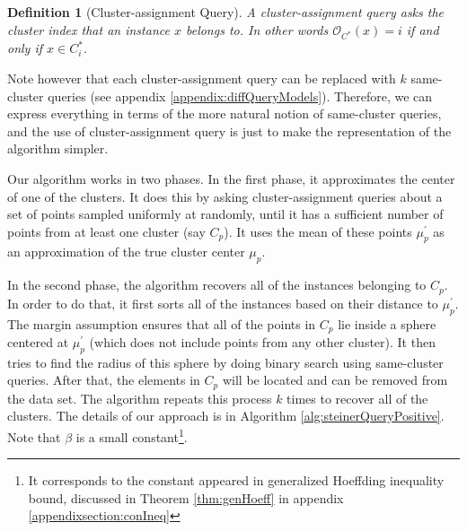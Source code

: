 \documentclass[12pt]{article}
\newcommand{\mc}{\mathcal}
\newtheorem{definition}[theorem]{Definition}
\begin{document}
\begin{definition}[Cluster-assignment Query]
A cluster-assignment query asks the cluster index that an instance $x$ belongs to. In other words ${\mc O_{C^*}}(x) = i$ if and only if $x \in C^*_i$.
\end{definition}

Note however that each cluster-assignment query can be replaced with $k$ same-cluster queries (see appendix \ref{appendix:diffQueryModels}). Therefore, we can express everything in terms of the more natural notion of same-cluster queries, and the use of cluster-assignment query is just to make the representation of the algorithm simpler.

Our algorithm works in two phases. In the first phase, it approximates the center of one of the clusters. It does this by asking cluster-assignment queries about a set of points sampled uniformly at randomly, until it has a sufficient number of points from at least one cluster (say $C_p$). It uses the mean of these points $\mu_p^\prime$ as an approximation of the true cluster center $\mu_p$. 

In the second phase, the algorithm recovers all of the instances belonging to $C_p$. In order to do that, it first sorts all of the instances based on their distance to $\mu_p^\prime$. The margin assumption ensures that all of the points in $C_p$ lie inside a sphere centered at $\mu_p^\prime$ (which does not include points from any other cluster). It then tries to find the radius of this sphere by doing binary search using same-cluster queries. After that, the elements in $C_p$ will be located and can be removed from the data set. The algorithm repeats this process $k$ times to recover all of the clusters. The details of our approach is in Algorithm \ref{alg:steinerQueryPositive}. Note that $\beta$ is a small constant\footnote{It corresponds to the constant appeared in generalized Hoeffding inequality bound, discussed in Theorem \ref{thm:genHoeff} in appendix \ref{appendixsection:conIneq} }. 
\end{document}
